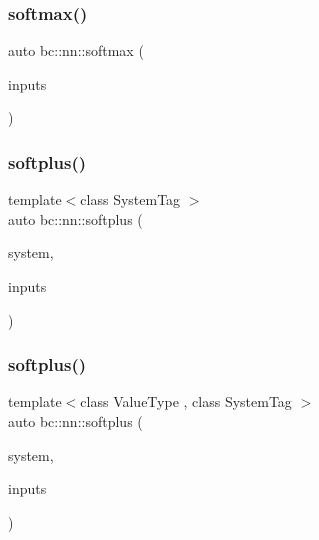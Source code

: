 \mbox{\label{namespacebc_1_1nn_a2c4469fa8ee39e64ffc2e0d5f1d6d0a6}} 
\subsubsection{\texorpdfstring{softmax()}{softmax()}\hspace{0.1cm}{\footnotesize\ttfamily [3/3]}}
{\footnotesize\ttfamily auto bc\+::nn\+::softmax (\begin{DoxyParamCaption}\item[{int}]{inputs }\end{DoxyParamCaption})}

\mbox{\label{namespacebc_1_1nn_a184b8d441f45f985daba7536d86e5f04}} 
\subsubsection{\texorpdfstring{softplus()}{softplus()}\hspace{0.1cm}{\footnotesize\ttfamily [1/5]}}
{\footnotesize\ttfamily template$<$class System\+Tag $>$ \\
auto bc\+::nn\+::softplus (\begin{DoxyParamCaption}\item[{System\+Tag}]{system,  }\item[{\hyperlink{namespacebc_aaf8e3fbf99b04b1b57c4f80c6f55d3c5}{bc\+::size\+\_\+t}}]{inputs }\end{DoxyParamCaption})}

\mbox{\label{namespacebc_1_1nn_a714a2159626268241bb644688f6cab47}} 
\subsubsection{\texorpdfstring{softplus()}{softplus()}\hspace{0.1cm}{\footnotesize\ttfamily [2/5]}}
{\footnotesize\ttfamily template$<$class Value\+Type , class System\+Tag $>$ \\
auto bc\+::nn\+::softplus (\begin{DoxyParamCaption}\item[{System\+Tag}]{system,  }\item[{\hyperlink{namespacebc_aaf8e3fbf99b04b1b57c4f80c6f55d3c5}{bc\+::size\+\_\+t}}]{inputs }\end{DoxyParamCaption})}

